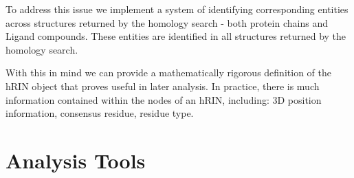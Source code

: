 To address this issue we implement a system of identifying corresponding entities across structures returned by the homology search - both protein chains and Ligand compounds. These entities are identified in all structures returned by the homology search. %



With this in mind we can provide a mathematically rigorous definition of the hRIN object that proves useful in later analysis.
In practice, there is much information contained within the nodes of an hRIN, including: 3D position information, consensus residue, residue type.



\section{Analysis Tools}
